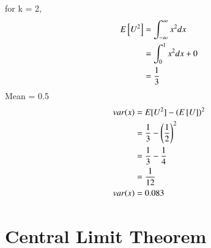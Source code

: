 \documentclass[journal,12pt,twocolumn]{IEEEtran}
\begin{document}
for k = 2,
\begin{align}
	E{}\left[U^2\right] &= \int_{-\infty}^{\infty}x^2dx \\
	 &= \int_{0}^{1}x^2dx + 0 \\
	 &= \frac{1}{3}
\end{align}
Mean = 0.5 \\
\begin{align}
	var(x) &= E[U^2] - (E{}\left[U\right])^2 \\
	 &= \frac{1}{3} - \left(\frac{1}{2}\right)^2 \\
	 &= \frac{1}{3} - \frac{1}{4} \\
	 &= \frac{1}{12} \\
	 var(x) &= 0.083
\end{align}
\section{Central Limit Theorem}
%
\end{document}
